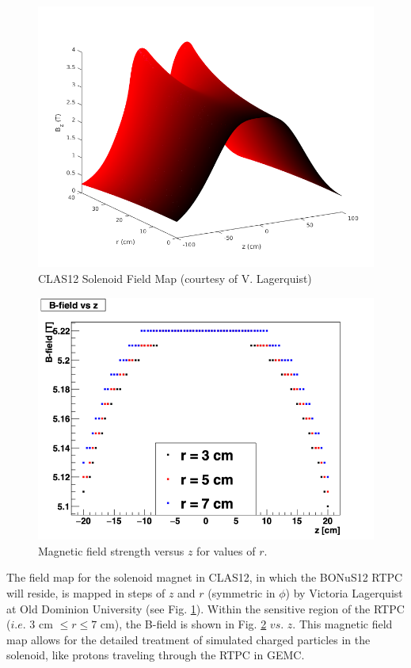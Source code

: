\begin{figure}[h!]
	\centering
	\includegraphics[width=0.8\linewidth]{figures/solenoid_map.png}
	\caption{CLAS12 Solenoid Field Map (courtesy of V. Lagerquist)}
	\label{fig:clas12_solenoid_map}
\end{figure}

\begin{figure}[h!]
	\centering
	\includegraphics[width=0.8\linewidth]{figures/bfield.png}
	\caption{Magnetic field strength versus $z$ for values of $r$.}
	\label{fig:bfield}
\end{figure}

The field map for the solenoid magnet in CLAS12, in which the BONuS12 RTPC will reside, is mapped in steps of $z$ and $r$ (symmetric in $\phi$) by Victoria Lagerquist at Old Dominion University (see Fig. \ref{fig:clas12_solenoid_map}). Within the sensitive region of the RTPC ($i.e.$ $3$ cm $\leq r \leq 7$ cm),  the B-field is shown in Fig. \ref{fig:bfield} $vs.$ $z$. This magnetic field map allows for the detailed treatment of simulated charged particles in the solenoid, like protons traveling through the RTPC in GEMC. 

